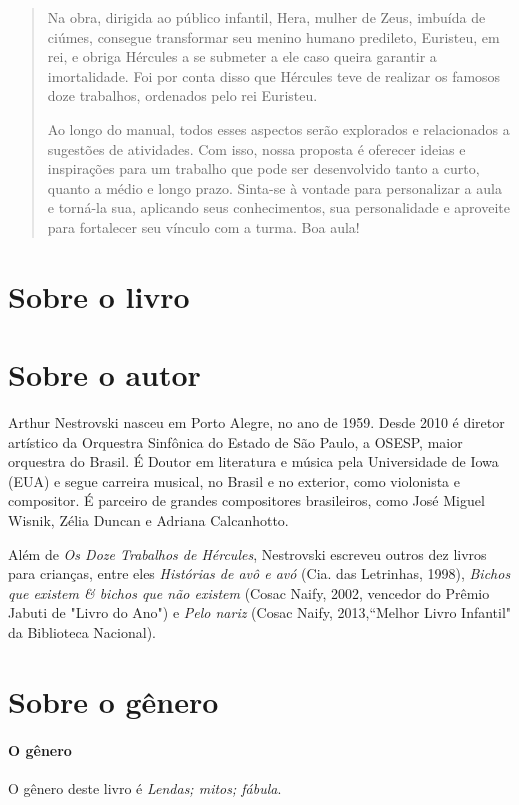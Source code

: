 \documentclass[11pt]{extarticle}
\begin{document}
\begin{abstract}
Na obra, dirigida ao público infantil, Hera, mulher de Zeus, imbuída de ciúmes, consegue transformar seu menino humano predileto, Euristeu, em rei, e obriga Hércules a se submeter a ele caso queira garantir a imortalidade. Foi por conta disso que Hércules teve de realizar os famosos doze trabalhos, ordenados pelo rei Euristeu. 

Ao longo do manual, todos esses aspectos serão explorados e relacionados a sugestões de atividades. Com isso, nossa proposta é oferecer ideias e inspirações para um trabalho que pode ser desenvolvido tanto a curto, quanto a médio e longo prazo. Sinta-se à vontade para personalizar a aula e torná-la sua, aplicando seus conhecimentos, sua personalidade e aproveite para fortalecer seu vínculo com a turma. Boa aula! 

\end{abstract}

\section{Sobre o livro}

\section{Sobre o autor}

Arthur Nestrovski nasceu em Porto Alegre, no ano de 1959. Desde 2010 é diretor artístico da Orquestra Sinfônica do Estado de São Paulo, a OSESP, maior orquestra do Brasil. É Doutor em literatura e música pela Universidade de Iowa (EUA) e segue carreira musical, no Brasil e no exterior, como violonista e compositor. É parceiro de grandes compositores brasileiros, como José Miguel Wisnik, Zélia Duncan e Adriana Calcanhotto. 

Além de \textit{Os Doze Trabalhos de Hércules}, Nestrovski escreveu outros dez livros para crianças, entre eles \textit{Histórias de avô e avó} (Cia. das Letrinhas, 1998), \textit{Bichos que existem & bichos que não existem} (Cosac
Naify, 2002, vencedor do Prêmio Jabuti de "Livro do Ano")
e \textit{Pelo nariz} (Cosac Naify, 2013,“Melhor Livro Infantil" da Biblioteca Nacional). 

\section{Sobre o gênero}

\paragraph{O gênero} O gênero deste livro é \textit{Lendas; mitos; fábula}. 
\end{document}
